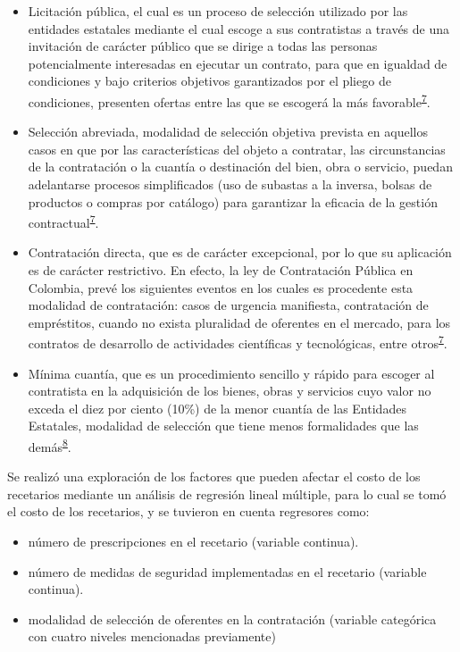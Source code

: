\documentclass[
]{book}
\begin{document}
\begin{itemize}
\item
  Licitación pública, el cual es un proceso de selección utilizado por las entidades estatales mediante el cual escoge a sus contratistas a través de una invitación de carácter público que se dirige a todas las personas potencialmente interesadas en ejecutar un contrato, para que en igualdad de condiciones y bajo criterios objetivos garantizados por el pliego de condiciones, presenten ofertas entre las que se escogerá la más favorable\textsuperscript{\protect\hyperlink{ref-MinisteriodeRelacionesExteriores2014}{7}}.
\item
  Selección abreviada, modalidad de selección objetiva prevista en aquellos casos en que por las características del objeto a contratar, las circunstancias de la contratación o la cuantía o destinación del bien, obra o servicio, puedan adelantarse procesos simplificados (uso de subastas a la inversa, bolsas de productos o compras por catálogo) para garantizar la eficacia de la gestión contractual\textsuperscript{\protect\hyperlink{ref-MinisteriodeRelacionesExteriores2014}{7}}.
\item
  Contratación directa, que es de carácter excepcional, por lo que su aplicación es de carácter restrictivo. En efecto, la ley de Contratación Pública en Colombia, prevé los siguientes eventos en los cuales es procedente esta modalidad de contratación: casos de urgencia manifiesta, contratación de empréstitos, cuando no exista pluralidad de oferentes en el mercado, para los contratos de desarrollo de actividades científicas y tecnológicas, entre otros\textsuperscript{\protect\hyperlink{ref-MinisteriodeRelacionesExteriores2014}{7}}.
\item
  Mínima cuantía, que es un procedimiento sencillo y rápido para escoger al contratista en la adquisición de los bienes, obras y servicios cuyo valor no exceda el diez por ciento (10\%) de la menor cuantía de las Entidades Estatales, modalidad de selección que tiene menos formalidades que las demás\textsuperscript{\protect\hyperlink{ref-ColombiaCompraEficiente2019}{8}}.
\end{itemize}

Se realizó una exploración de los factores que pueden afectar el costo de los recetarios mediante un análisis de regresión lineal múltiple, para lo cual se tomó el costo de los recetarios, y se tuvieron en cuenta regresores como:

\begin{itemize}
\item
  número de prescripciones en el recetario (variable continua).
\item
  número de medidas de seguridad implementadas en el recetario (variable continua).
\item
  modalidad de selección de oferentes en la contratación (variable categórica con cuatro niveles mencionadas previamente)
\end{itemize}
\end{document}
